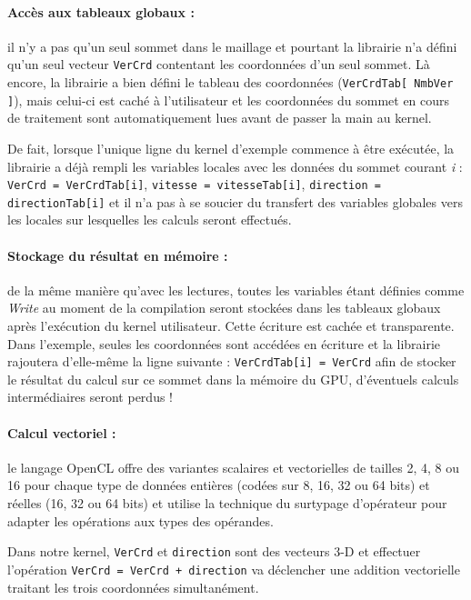 \documentclass[a4paper,12pt]{article}
\begin{document}
\paragraph{Accès aux tableaux globaux : } il n'y a pas qu'un seul sommet dans le maillage et pourtant la librairie n'a défini qu'un seul vecteur {\tt VerCrd} contentant les coordonnées d'un seul sommet.
Là encore, la librairie a bien défini le tableau des coordonnées ({\tt VerCrdTab[ NmbVer ]}), mais celui-ci est caché à l'utilisateur et les coordonnées du sommet en cours de traitement sont automatiquement lues avant de passer la main au kernel.

De fait, lorsque l'unique ligne du kernel d'exemple commence à être exécutée, la librairie a déjà rempli les variables locales avec les données du sommet courant \emph{i} : {\tt VerCrd = VerCrdTab[i]}, {\tt vitesse = vitesseTab[i]}, {\tt direction = directionTab[i]} et il n'a pas à se soucier du transfert des variables globales vers les locales sur lesquelles les calculs seront effectués.

\paragraph{Stockage du résultat en mémoire : } de la même manière qu'avec les lectures, toutes les variables étant définies comme \emph{Write} au moment de la compilation seront stockées dans les tableaux globaux après l'exécution du kernel utilisateur.
Cette écriture est cachée et transparente. Dans l'exemple, seules les coordonnées sont accédées en écriture et la librairie rajoutera d'elle-même la ligne suivante : {\tt VerCrdTab[i] = VerCrd} afin de stocker le résultat du calcul sur ce sommet dans la mémoire du GPU, d'éventuels calculs intermédiaires seront perdus !

\paragraph{Calcul vectoriel : } le langage OpenCL offre des variantes scalaires et vectorielles de tailles 2, 4, 8 ou 16 pour chaque type de données entières (codées sur 8, 16, 32 ou 64 bits) et réelles (16, 32 ou 64 bits) et utilise la technique du surtypage d'opérateur pour adapter les opérations aux types des opérandes.

Dans notre kernel, {\tt VerCrd} et {\tt direction} sont des vecteurs 3-D et effectuer l'opération {\tt VerCrd = VerCrd + direction} va déclencher une addition vectorielle traitant les trois coordonnées simultanément.
\end{document}

